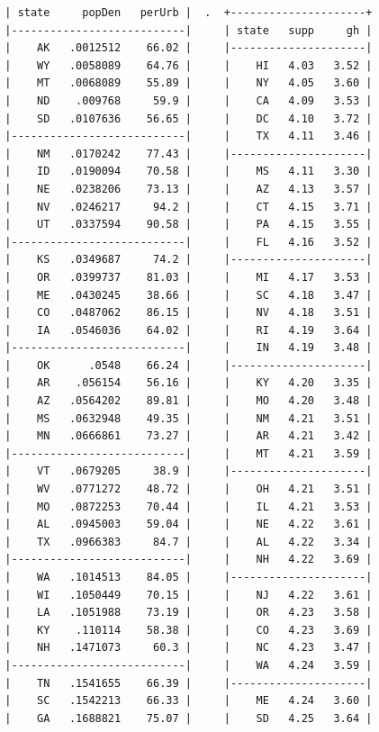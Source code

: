 \documentclass[10pt, letterpaper]{article}
\begin{document}
\begin{spacing}{1.4}
\begin{spacing}{.8}
\begin{verbatim}
  | state     popDen   perUrb |  .  +---------------------+ 
  |---------------------------|     | state   supp     gh | 
  |    AK   .0012512    66.02 |     |---------------------| 
  |    WY   .0058089    64.76 |     |    HI   4.03   3.52 | 
  |    MT   .0068089    55.89 |     |    NY   4.05   3.60 | 
  |    ND    .009768     59.9 |     |    CA   4.09   3.53 | 
  |    SD   .0107636    56.65 |     |    DC   4.10   3.72 | 
  |---------------------------|     |    TX   4.11   3.46 | 
  |    NM   .0170242    77.43 |     |---------------------| 
  |    ID   .0190094    70.58 |     |    MS   4.11   3.30 | 
  |    NE   .0238206    73.13 |     |    AZ   4.13   3.57 | 
  |    NV   .0246217     94.2 |     |    CT   4.15   3.71 | 
  |    UT   .0337594    90.58 |     |    PA   4.15   3.55 | 
  |---------------------------|     |    FL   4.16   3.52 | 
  |    KS   .0349687     74.2 |     |---------------------| 
  |    OR   .0399737    81.03 |     |    MI   4.17   3.53 | 
  |    ME   .0430245    38.66 |     |    SC   4.18   3.47 | 
  |    CO   .0487062    86.15 |     |    NV   4.18   3.51 | 
  |    IA   .0546036    64.02 |     |    RI   4.19   3.64 | 
  |---------------------------|     |    IN   4.19   3.48 | 
  |    OK      .0548    66.24 |     |---------------------| 
  |    AR    .056154    56.16 |     |    KY   4.20   3.35 | 
  |    AZ   .0564202    89.81 |     |    MO   4.20   3.48 | 
  |    MS   .0632948    49.35 |     |    NM   4.21   3.51 | 
  |    MN   .0666861    73.27 |     |    AR   4.21   3.42 | 
  |---------------------------|     |    MT   4.21   3.59 | 
  |    VT   .0679205     38.9 |     |---------------------| 
  |    WV   .0771272    48.72 |     |    OH   4.21   3.51 | 
  |    MO   .0872253    70.44 |     |    IL   4.21   3.53 | 
  |    AL   .0945003    59.04 |     |    NE   4.22   3.61 | 
  |    TX   .0966383     84.7 |     |    AL   4.22   3.34 | 
  |---------------------------|     |    NH   4.22   3.69 | 
  |    WA   .1014513    84.05 |     |---------------------| 
  |    WI   .1050449    70.15 |     |    NJ   4.22   3.61 | 
  |    LA   .1051988    73.19 |     |    OR   4.23   3.58 | 
  |    KY    .110114    58.38 |     |    CO   4.23   3.69 | 
  |    NH   .1471073     60.3 |     |    NC   4.23   3.47 | 
  |---------------------------|     |    WA   4.24   3.59 | 
  |    TN   .1541655    66.39 |     |---------------------| 
  |    SC   .1542213    66.33 |     |    ME   4.24   3.60 | 
  |    GA   .1688821    75.07 |     |    SD   4.25   3.64 | 

\end{verbatim}
\end{spacing}
\end{spacing}
\end{document}
